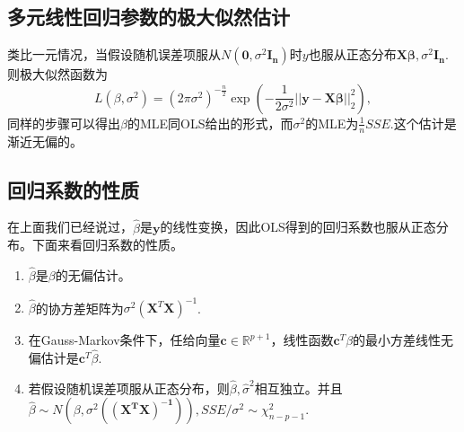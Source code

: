 \documentclass[lang=cn,10pt]{elegantbook}
\begin{document}
    \subsection{多元线性回归参数的极大似然估计}
    类比一元情况，当假设随机误差项服从\(N(\mathbf{0},\sigma^2\mathbf{I_n})\)时\(y\)也服从正态分布\(\mathbf{X\beta},\sigma^2\mathbf{I_n}\).则极大似然函数为
    \[L(\beta,\sigma^2)=(2\pi\sigma^2)^{-\frac{n}{2}}\exp{(-\frac{1}{2\sigma^2}||\mathbf{y-X\beta}||_2^2)},\]
    同样的步骤可以得出\(\beta\)的MLE同OLS给出的形式，而\(\sigma^2\)的MLE为\(\frac{1}{n}SSE\).这个估计是渐近无偏的。
    \subsection{回归系数的性质}
    在上面我们已经说过，\(\hat{\beta}\)是\(\mathbf{y}\)的线性变换，因此OLS得到的回归系数也服从正态分布。下面来看回归系数的性质。
    \begin{property}
        \begin{enumerate}
        \item \(\hat{\beta}\)是\(\beta\)的无偏估计。
        \item \(\hat{\beta}\)的协方差矩阵为\(\sigma^2(\mathbf{X}^T\mathbf{X})^{-1}\).
        \item 在Gauss-Markov条件下，任给向量\(\mathbf{c}\in\mathbb{R}^{p+1}\)，线性函数\(\mathbf{c}^T\beta\)的最小方差线性无偏估计是\(\mathbf{c}^T\hat{\beta}\).
        \item 若假设随机误差项服从正态分布，则\(\hat{\beta},\hat{\sigma}^2\)相互独立。并且\(\hat{\beta}\sim N(\beta,\sigma^2(\mathbf{(X^TX)^{-1}})),SSE/\sigma^2\sim \chi_{n-p-1}^2.\)
    \end{enumerate}
    \end{property}
\end{document}

